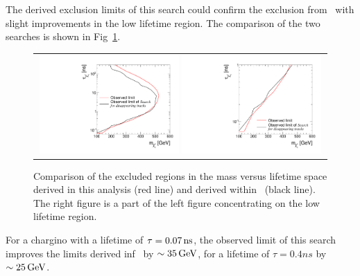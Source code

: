 The derived exclusion limits of this search could confirm the exclusion from~\cite{bib:CMS:DT_8TeV} with slight improvements in the low lifetime region.
The comparison of the two searches is shown in Fig~\ref{fig:Comparison2dLimit}.
\begin{figure}[!t]
  \centering 
  \begin{tabular}{c}
    \includegraphics[width=0.49\textwidth]{figures/analysis/Interpretation/Comparison2dLimits_largerRange.pdf}  
    \includegraphics[width=0.49\textwidth]{figures/analysis/Interpretation/Comparison2dLimits.pdf} 
  \end{tabular}
  \caption{Comparison of the excluded regions in the mass versus lifetime space derived in this analysis (red line) and derived within~\cite{bib:CMS:DT_8TeV} (black line). The right figure is a part of the left figure concentrating on the low lifetime region.}
  \vspace{50pt}
  \label{fig:Comparison2dLimit}
\end{figure} 
For a chargino with a lifetime of $\tau=0.07\,\text{ns}$, the observed limit of this search improves the limits derived inf~\cite{bib:CMS:DT_8TeV} by $\sim35\,\text{Ge}\kern-0.06667em\text{V}$, for a lifetime of $\tau=0.4ns$ by $\sim25\,\text{Ge}\kern-0.06667em\text{V}$. 

